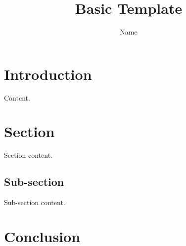 \documentclass{article}
\title{Basic Template}
\author{Name}
\date{}
\begin{document}
\maketitle
\section{Introduction}
Content.

\section{Section}
Section content.
\subsection{Sub-section}
Sub-section content.

\section{Conclusion}
\end{document}
